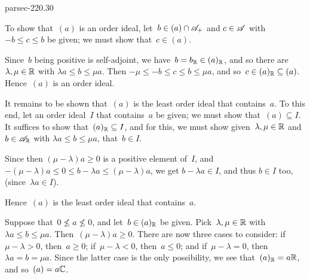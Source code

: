 \documentclass[b5page]{book}
\begin{document}
\begin{solution}{parsec-220.30}
\begin{enumerate}
To show that~$(a)$ is an order ideal,
let~$b\in (a)\cap \mathscr{A}_+$ 
and $c\in\mathscr{A}$ with $-b\leq c\leq b$ be given;
we must show that~$c\in(a)$.

Since~$b$ being positive is self-adjoint,
we have~$b=b_{\mathbb{R}}\in (a)_{\mathbb{R}}$,
and so there are $\lambda,\mu\in \mathbb{R}$
with $\lambda a\leq b\leq \mu a$.
Then $-\mu \leq-b \leq c \leq b  \leq \mu a$,
and so~$c\in (a)_{\mathbb{R}}\subseteq (a)$.
Hence~$(a)$ is an order ideal.

It remains to be shown that~$(a)$ is the least order ideal
that contains~$a$. 
To this end, let an order ideal~$I$ that contains~$a$ be given;
we must show that~$(a)\subseteq I$.
It suffices to show that~$(a)_{\mathbb{R}}\subseteq I$,
and for this,
we must show given~$\lambda,\mu\in \mathbb{R}$
and~$b\in \mathscr{A}_{\mathbb{R}}$ with $\lambda a \leq b \leq \mu a$,
that~$b\in I$.

Since then $(\mu-\lambda)a \geq 0$
is a positive element of~$I$,
and $-(\mu-\lambda)a\leq 0 \leq b-\lambda a \leq (\mu-\lambda)a$,
we get $b-\lambda a \in I$,
and thus $b\in I$ too, (since~$\lambda a\in I$).

Hence~$(a)$ is the least order ideal that contains~$a$.

Suppose that~$0\nleq a\nleq 0$,
and let~$b\in (a)_{\mathbb{R}}$ be given.
Pick~$\lambda,\mu \in \mathbb{R}$ with $\lambda a \leq b \leq \mu a$.
Then~$(\mu-\lambda)a\geq 0$.
There are now three cases to consider:
if~$\mu-\lambda >0$, then~$a\geq 0$;
if~$\mu-\lambda < 0$, then~$a\leq 0$;
and if~$\mu-\lambda = 0$, then~$\lambda a = b = \mu a$.
Since the latter case is the only possibility,
we see that~$(a)_{\mathbb{R}}=a\mathbb{R}$, and so~$(a)=a\mathbb{C}$.


\end{enumerate}
\end{solution}
\end{document}
